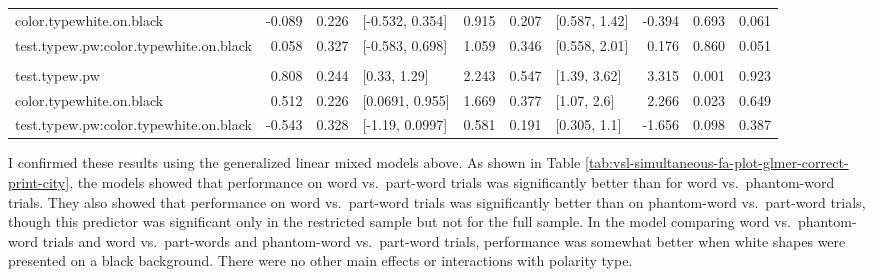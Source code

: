 \documentclass[
]{article}
\begin{document}
\begin{longtable}[t]{lrrlrrlrrr}
\hspace{1em}color.typewhite.on.black & -0.089 & 0.226 & {}[-0.532, 0.354] & 0.915 & 0.207 & {}[0.587, 1.42] & -0.394 & 0.693 & 0.061\\
\hspace{1em}test.typew.pw:color.typewhite.on.black & 0.058 & 0.327 & {}[-0.583, 0.698] & 1.059 & 0.346 & {}[0.558, 2.01] & 0.176 & 0.860 & 0.051\\
\addlinespace[0.3em]
\multicolumn{10}{l}{\textbf{Restricted sample - w.pw vs. phw.pw}}\\
\hspace{1em}test.typew.pw & 0.808 & 0.244 & {}[0.33, 1.29] & 2.243 & 0.547 & {}[1.39, 3.62] & 3.315 & 0.001 & 0.923\\
\hspace{1em}color.typewhite.on.black & 0.512 & 0.226 & {}[0.0691, 0.955] & 1.669 & 0.377 & {}[1.07, 2.6] & 2.266 & 0.023 & 0.649\\
\hspace{1em}test.typew.pw:color.typewhite.on.black & -0.543 & 0.328 & {}[-1.19, 0.0997] & 0.581 & 0.191 & {}[0.305, 1.1] & -1.656 & 0.098 & 0.387\\
\bottomrule
\end{longtable}

I confirmed these results using the generalized linear mixed models
above. As shown in Table
\ref{tab:vsl-simultaneous-fa-plot-glmer-correct-print-city}, the models
showed that performance on word vs.~part-word trials was significantly
better than for word vs.~phantom-word trials. They also showed that
performance on word vs.~part-word trials was significantly better than
on phantom-word vs.~part-word trials, though this predictor was
significant only in the restricted sample but not for the full sample.
In the model comparing word vs.~phantom-word trials and word
vs.~part-words and phantom-word vs.~part-word trials, performance was
somewhat better when white shapes were presented on a black background.
There were no other main effects or interactions with polarity type.

  
\end{document}
